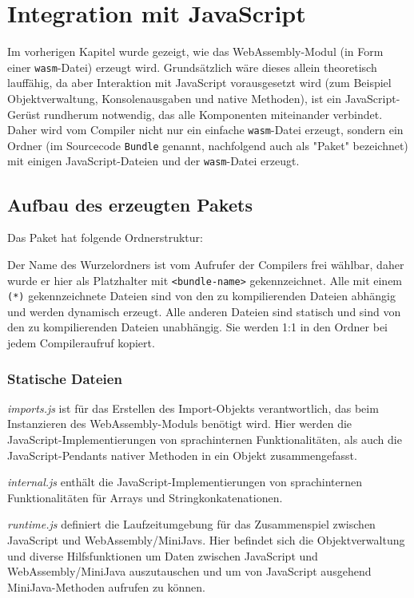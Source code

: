 \chapter{Integration mit JavaScript}

Im vorherigen Kapitel wurde gezeigt, wie das WebAssembly-Modul (in Form einer \lstinline{wasm}-Datei) erzeugt wird. Grundsätzlich wäre dieses allein theoretisch lauffähig, da aber Interaktion mit JavaScript vorausgesetzt wird (zum Beispiel Objektverwaltung, Konsolenausgaben und native Methoden), ist ein JavaScript-Gerüst rundherum notwendig, das alle Komponenten miteinander verbindet. Daher wird vom Compiler nicht nur ein einfache \lstinline{wasm}-Datei erzeugt, sondern ein Ordner (im Sourcecode \lstinline{Bundle} genannt, nachfolgend auch als "Paket" bezeichnet) mit einigen JavaScript-Dateien und der \lstinline{wasm}-Datei erzeugt.

\section{Aufbau des erzeugten Pakets}

Das Paket hat folgende Ordnerstruktur:


Der Name des Wurzelordners ist vom Aufrufer der Compilers frei wählbar, daher wurde er hier als Platzhalter mit \lstinline{<bundle-name>} gekennzeichnet. Alle mit einem \lstinline{(*)} gekennzeichnete Dateien sind von den zu kompilierenden Dateien abhängig und werden dynamisch erzeugt. Alle anderen Dateien sind statisch und sind von den zu kompilierenden Dateien unabhängig. Sie werden 1:1 in den Ordner bei jedem Compileraufruf kopiert.

\subsection{Statische Dateien}

\emph{imports.js} ist für das Erstellen des Import-Objekts verantwortlich, das beim Instanzieren des WebAssembly-Moduls benötigt wird. Hier werden die JavaScript-Implementie\-rungen von sprachinternen Funktionalitäten, als auch die JavaScript-Pendants nativer Methoden in ein Objekt zusammengefasst.

\emph{internal.js} enthält die JavaScript-Implementierungen von sprachinternen Funktionalitäten für Arrays und Stringkonkatenationen.

\emph{runtime.js} definiert die Laufzeitumgebung für das Zusammenspiel zwischen JavaScript und WebAssembly/MiniJavs. Hier befindet sich die Objektverwaltung und diverse Hilfsfunktionen um Daten zwischen JavaScript und WebAssembly/MiniJava auszutauschen und um von JavaScript ausgehend MiniJava-Methoden aufrufen zu können.

